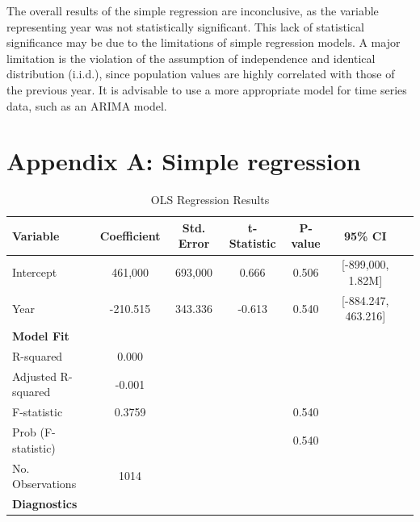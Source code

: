 \documentclass{article}
\begin{document}
The overall results of the simple regression are inconclusive, as the variable representing
year was not statistically significant. This lack of statistical significance may be due to
the limitations of simple regression models. A major limitation is the violation of the
assumption of independence and identical distribution (i.i.d.), since population values are
highly correlated with those of the previous year. It is advisable to use a more appropriate
model for time series data, such as an ARIMA model.


\section*{Appendix A: Simple regression}

\begin{table}[ht]
	\centering
	\caption{OLS Regression Results}
	\begin{tabular}{lcccccc}
		\hline
		\textbf{Variable}    & \textbf{Coefficient} & \textbf{Std. Error} & \textbf{t-Statistic} & \textbf{P-value} & \textbf{95\% CI}    \\
		\hline
		Intercept            & 461,000              & 693,000             & 0.666                & 0.506            & [-899,000, 1.82M]   \\
		Year                 & -210.515             & 343.336             & -0.613               & 0.540            & [-884.247, 463.216] \\
		\hline
		\textbf{Model Fit}   &                      &                     &                      &                  &                     \\
		\hline
		R-squared            & 0.000                &                     &                      &                  &                     \\
		Adjusted R-squared   & -0.001               &                     &                      &                  &                     \\
		F-statistic          & 0.3759               &                     &                      & 0.540            &                     \\
		Prob (F-statistic)   &                      &                     &                      & 0.540            &                     \\
		No. Observations     & 1014                 &                     &                      &                  &                     \\
		\hline
		\textbf{Diagnostics} &                      &                     &                      &                  &                     \\

\end{tabular}
\end{table}
\end{document}
